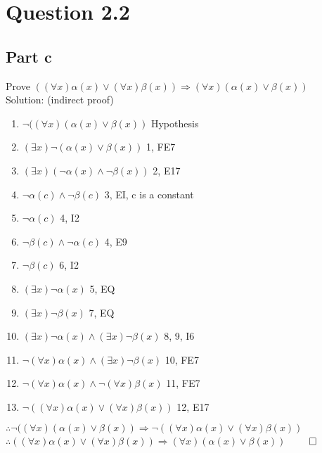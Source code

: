\documentclass{article}
\begin{document}
	\section{Question 2.2}
		\subsection{Part c}
			Prove $((\forall x)\alpha(x) \lor (\forall x)\beta(x)) \Rightarrow (\forall x)(\alpha(x) \lor \beta(x))$ \\
			Solution: (indirect proof) \\
			\begin{enumerate}
				\item $\lnot((\forall x)(\alpha(x) \lor \beta(x))$ \hfill Hypothesis
				\item $(\exists x)\lnot(\alpha(x) \lor \beta(x))$ \hfill 1, FE7
				\item $(\exists x)(\lnot\alpha(x) \land \lnot\beta(x))$ \hfill 2, E17
				\item $\lnot\alpha(c) \land \lnot\beta(c)$ \hfill 3, EI, c is a constant
				\item $\lnot\alpha(c)$ \hfill 4, I2 
				\item $\lnot\beta(c) \land \lnot\alpha(c)$ \hfill 4, E9 
				\item $\lnot\beta(c)$ \hfill 6, I2
				\item $(\exists x)\lnot\alpha(x)$ \hfill 5, EQ
				\item $(\exists x)\lnot\beta(x)$ \hfill 7, EQ
				\item $(\exists x)\lnot\alpha(x) \land (\exists x)\lnot\beta(x)$ \hfill 8, 9, I6
				\item $\lnot(\forall x)\alpha(x) \land (\exists x)\lnot\beta(x)$ \hfill 10, FE7
				\item $\lnot(\forall x)\alpha(x) \land \lnot(\forall x)\beta(x)$ \hfill 11, FE7
				\item $\lnot((\forall x)\alpha(x) \lor (\forall x)\beta(x))$ \hfill 12, E17
			\end{enumerate}
			$\therefore \lnot((\forall x)(\alpha(x) \lor \beta(x)) \Rightarrow \lnot((\forall x)\alpha(x) \lor (\forall x)\beta(x))$ \\
			$\therefore ((\forall x)\alpha(x) \lor (\forall x)\beta(x)) \Rightarrow (\forall x)(\alpha(x) \lor \beta(x))$ \hfill $\qed$ \\
\end{document}
